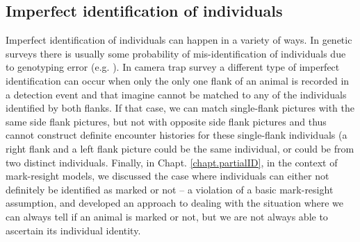 \subsection{Imperfect identification of individuals}

Imperfect identification of individuals can happen in a variety of
ways. In genetic surveys there is usually some probability of
mis-identification of individuals due to genotyping error
(e.g. \citet{lukacs_burnham:2005}). In camera trap survey a different
type of imperfect identification can occur when only the only one
flank of an animal is recorded in a detection event and that imagine
cannot be matched to any of the individuals identified by both
flanks. If that case, we can match single-flank pictures with the same
side flank pictures, but not with opposite side flank pictures and
thus cannot construct definite encounter histories for these
single-flank individuals (a right flank and a left flank picture could
be the same individual, or could be from two distinct
individuals. Finally, in Chapt. \ref{chapt.partialID}, in the context
of mark-resight models, we discussed the case where individuals can
either not definitely be identified as marked or not -- a violation of
a basic mark-resight assumption, and developed an approach to dealing
with the situation where we can always tell if an animal is marked or
not, but we are not always able to ascertain its individual identity.

